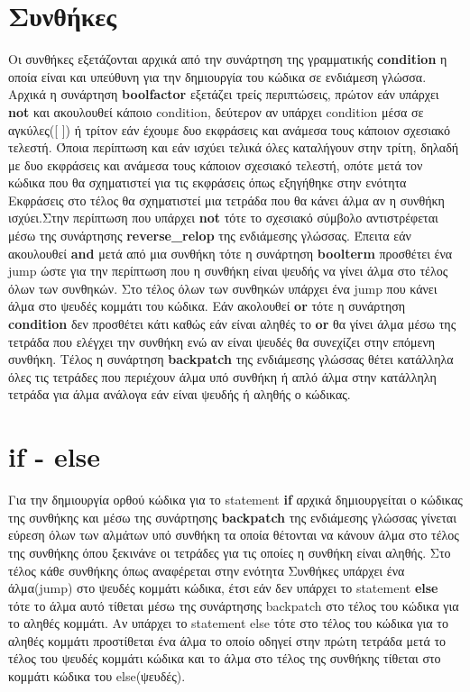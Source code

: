 \documentclass[12pt,a4paper,a4paper]{report}
\begin{document}
\section{Συνθήκες}
Οι συνθήκες εξετάζονται αρχικά από την συνάρτηση της γραμματικής \textbf{condition} η οποία είναι και υπεύθυνη για την δημιουργία του κώδικα σε ενδιάμεση γλώσσα. Αρχικά η συνάρτηση \textbf{boolfactor}  εξετάζει τρείς περιπτώσεις, πρώτον εάν υπάρχει \textbf{not} και ακουλουθεί κάποιο condition, δεύτερον αν υπάρχει condition μέσα σε αγκύλες([ ]) ή τρίτον εάν έχουμε δυο εκφράσεις και ανάμεσα τους κάποιον σχεσιακό τελεστή.  Όποια περίπτωση και εάν ισχύει τελικά όλες καταλήγουν στην τρίτη, δηλαδή με δυο εκφράσεις και ανάμεσα τους κάποιον σχεσιακό τελεστή, οπότε μετά τον κώδικα που θα σχηματιστεί για τις εκφράσεις όπως εξηγήθηκε στην ενότητα Εκφράσεις στο τέλος θα σχηματιστεί μια τετράδα που θα κάνει άλμα αν η συνθήκη ισχύει.Στην περίπτωση που υπάρχει \textbf{not} τότε το σχεσιακό σύμβολο αντιστρέφεται μέσω της συνάρτησης \textbf{reverse\_relop} της ενδιάμεσης γλώσσας. Έπειτα εάν ακουλουθεί \textbf{and} μετά από μια συνθήκη τότε η συνάρτηση \textbf{boolterm} προσθέτει ένα jump ώστε για την περίπτωση που η συνθήκη είναι ψευδής να γίνει άλμα στο τέλος όλων των συνθηκών. Στο τέλος όλων των συνθηκών υπάρχει ένα jump που κάνει άλμα στο ψευδές κομμάτι του κώδικα. Εάν ακολουθεί \textbf{or} τότε η συνάρτηση \textbf{condition} δεν προσθέτει κάτι καθώς εάν είναι αληθές το \textbf{or} θα γίνει άλμα μέσω της τετράδα που ελέγχει την συνθήκη ενώ αν είναι ψευδές θα συνεχίζει στην επόμενη συνθήκη. Τέλος η συνάρτηση \textbf{backpatch} της ενδιάμεσης γλώσσας θέτει κατάλληλα όλες τις τετράδες που περιέχουν άλμα υπό συνθήκη ή απλό άλμα στην κατάλληλη τετράδα για άλμα ανάλογα εάν είναι ψευδής ή αληθής ο κώδικας.
\section{if - else}
Για την δημιουργία ορθού κώδικα για το statement \textbf{if} αρχικά δημιουργείται ο κώδικας της συνθήκης και μέσω της συνάρτησης  \textbf{backpatch} της ενδιάμεσης γλώσσας γίνεται εύρεση όλων των αλμάτων υπό συνθήκη τα οποία θέτονται να κάνουν άλμα στο τέλος της συνθήκης όπου ξεκινάνε οι τετράδες για τις οποίες η συνθήκη είναι αληθής. Στο τέλος κάθε συνθήκης όπως αναφέρεται στην ενότητα Συνθήκες υπάρχει ένα άλμα(jump) στο ψευδές κομμάτι κώδικα, έτσι εάν δεν υπάρχει το statement \textbf{else} τότε το άλμα αυτό τίθεται μέσω της συνάρτησης backpatch στο τέλος του κώδικα για το αληθές κομμάτι. Αν υπάρχει το statement else τότε στο τέλος του κώδικα για το αληθές κομμάτι προστίθεται ένα άλμα το οποίο οδηγεί στην πρώτη τετράδα μετά το τέλος του ψευδές κομμάτι κώδικα και το άλμα στο τέλος της συνθήκης τίθεται στο κομμάτι κώδικα του else(ψευδές).
\end{document}
